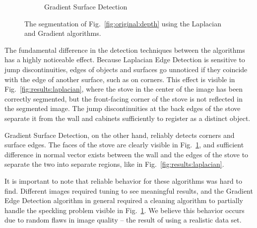 \begin{figure}
\begin{subfigure}[t]{0.33\textwidth}
        \caption{Gradient Surface Detection}
        \label{fig:results:gradient}
    \end{subfigure}
    \caption{The segmentation of Fig.~\ref{fig:original:depth} using the Laplacian and Gradient algorithms.}
    \label{fig:results}
\end{figure}

The fundamental difference in the detection techniques between the algorithms has a highly noticeable effect.  Because Laplacian Edge Detection is sensitive to jump discontinuities, edges of objects and surfaces go unnoticed if they coincide with the edge of another surface, such as on corners.  This effect is visible in  Fig.~\ref{fig:results:laplacian}, where the stove in the center of the image has been correctly segmented, but the front-facing corner of the stove is not reflected in the segmented image.  The jump discontinuities at the back edges of the stove separate it from the wall and cabinets sufficiently to register as a distinct object.

Gradient Surface Detection, on the other hand, reliably detects corners and surface edges.  The faces of the stove are clearly visible in Fig.~\ref{fig:results:gradient}, and sufficient difference in normal vector exists between the wall and the edges of the stove to separate the two into separate regions, like in Fig.~\ref{fig:results:laplacian}.  

It is important to note that reliable behavior for these algorithms was hard to find.  Different images required tuning to see meaningful results, and the Gradient Edge Detection algorithm in general required a cleaning algorithm to partially handle the speckling problem visible in Fig.~\ref{fig:results:gradient}.  We believe this behavior occurs due to random flaws in image quality -- the result of using a realistic data set.